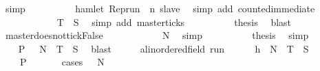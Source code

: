 \begin{isabellebody}
\ simp\isanewline
\ \ \ \ \ \ \ \ \isamarkupfalse%
\ {\isacartoucheopen}hamlet\ {\isacharparenleft}Rep{\isacharunderscore}run\ {\isasymrho}\ n\ slave{\isacharparenright}{\isacartoucheclose}\ \isamarkupfalse%
\ {\isacharparenleft}simp\ add{\isacharcolon}\ counted{\isacharunderscore}immediate{\isacharparenright}\isanewline
\ \ \ \ \ \ \ \ \isamarkupfalse%
\ {\isacartoucheopen}{\isasymrho}\ {\isasymin}\ {\isacharquery}T\ {\isasyminter}\ {\isacharquery}S{\isacartoucheclose}\ \isamarkupfalse%
\ {\isacharparenleft}simp\ add{\isacharcolon}\ master{\isacharunderscore}ticks{\isacharparenright}\isanewline
\ \ \ \ \ \ \ \ \isamarkupfalse%
\ {\isacharquery}thesis\ \isamarkupfalse%
\ blast\isanewline
\ \ \ \ \isamarkupfalse%
\isanewline
\ \ \ \ \ \ \isamarkupfalse%
\ master{\isacharunderscore}doesnot{\isacharunderscore}tick{\isacharcolon}False\isanewline
\ \ \ \ \ \ \ \ \isamarkupfalse%
\ {\isacartoucheopen}{\isasymrho}\ {\isasymin}\ {\isacharquery}N{\isacartoucheclose}\ \isamarkupfalse%
\ simp\isanewline
\ \ \ \ \ \ \ \ \isamarkupfalse%
\ {\isacharquery}thesis\ \isamarkupfalse%
\ simp\isanewline
\ \ \ \ \isamarkupfalse%
\isanewline
\ \ \isacommand{{\isacharbraceright}}\isamarkupfalse%
\ \isamarkupfalse%
\ {\isacartoucheopen}{\isacharbraceleft}{\isasymrho}{\isachardot}\ {\isacharquery}P\ {\isasymrho}{\isacharbraceright}\ {\isasymsubseteq}\ {\isacharquery}N\ {\isasymunion}\ {\isacharquery}T\ {\isasyminter}\ {\isacharquery}S{\isacartoucheclose}\ \isamarkupfalse%
\ blast\isanewline
\ \ \isacommand{{\isacharbraceleft}}\isamarkupfalse%
\ \isamarkupfalse%
\ {\isasymrho}{\isacharcolon}{\isacharcolon}{\isacartoucheopen}{\isacharparenleft}{\isacharprime}a{\isacharcolon}{\isacharcolon}linordered{\isacharunderscore}field{\isacharparenright}\ run{\isacartoucheclose}\isanewline
\ \ \ \ \isamarkupfalse%
\ h{\isacharcolon}{\isacartoucheopen}{\isasymrho}\ {\isasymin}\ {\isacharquery}N\ {\isasymunion}\ {\isacharquery}T\ {\isasyminter}\ {\isacharquery}S{\isacartoucheclose}\isanewline
\ \ \ \ \isamarkupfalse%
\ {\isacartoucheopen}{\isasymrho}\ {\isasymin}\ {\isacharbraceleft}{\isasymrho}{\isachardot}\ {\isacharquery}P\ {\isasymrho}{\isacharbraceright}{\isacartoucheclose}\isanewline
\ \ \ \ \isamarkupfalse%
\ {\isacharparenleft}cases\ {\isacartoucheopen}{\isasymrho}\ {\isasymin}\ {\isacharquery}N{\isacartoucheclose}{\isacharparenright}\isanewline

\end{isabellebody}
